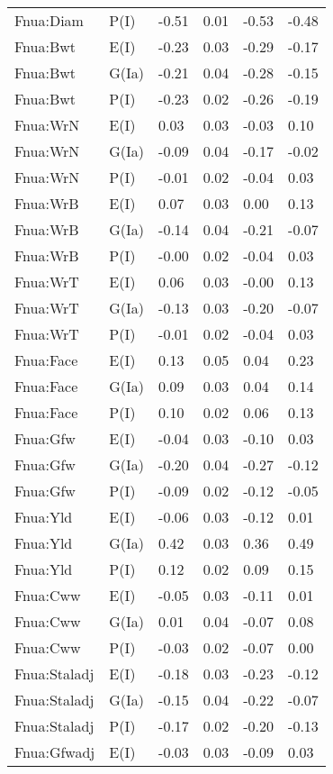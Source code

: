 \begin{center}
\begin{longtable}{|p{1.1in}|p{0.7in}|p{0.7in}|p{0.6in}|p{0.6in}|p{0.6in}|}
  Fnua:Diam & P(I) & -0.51 & 0.01 & -0.53 & -0.48 \\ 
  Fnua:Bwt & E(I) & -0.23 & 0.03 & -0.29 & -0.17 \\ 
  Fnua:Bwt & G(Ia) & -0.21 & 0.04 & -0.28 & -0.15 \\ 
  Fnua:Bwt & P(I) & -0.23 & 0.02 & -0.26 & -0.19 \\ 
  Fnua:WrN & E(I) & 0.03 & 0.03 & -0.03 & 0.10 \\ 
  Fnua:WrN & G(Ia) & -0.09 & 0.04 & -0.17 & -0.02 \\ 
  Fnua:WrN & P(I) & -0.01 & 0.02 & -0.04 & 0.03 \\ 
  Fnua:WrB & E(I) & 0.07 & 0.03 & 0.00 & 0.13 \\ 
  Fnua:WrB & G(Ia) & -0.14 & 0.04 & -0.21 & -0.07 \\ 
  Fnua:WrB & P(I) & -0.00 & 0.02 & -0.04 & 0.03 \\ 
  Fnua:WrT & E(I) & 0.06 & 0.03 & -0.00 & 0.13 \\ 
  Fnua:WrT & G(Ia) & -0.13 & 0.03 & -0.20 & -0.07 \\ 
  Fnua:WrT & P(I) & -0.01 & 0.02 & -0.04 & 0.03 \\ 
  Fnua:Face & E(I) & 0.13 & 0.05 & 0.04 & 0.23 \\ 
  Fnua:Face & G(Ia) & 0.09 & 0.03 & 0.04 & 0.14 \\ 
  Fnua:Face & P(I) & 0.10 & 0.02 & 0.06 & 0.13 \\ 
  Fnua:Gfw & E(I) & -0.04 & 0.03 & -0.10 & 0.03 \\ 
  Fnua:Gfw & G(Ia) & -0.20 & 0.04 & -0.27 & -0.12 \\ 
  Fnua:Gfw & P(I) & -0.09 & 0.02 & -0.12 & -0.05 \\ 
  Fnua:Yld & E(I) & -0.06 & 0.03 & -0.12 & 0.01 \\ 
  Fnua:Yld & G(Ia) & 0.42 & 0.03 & 0.36 & 0.49 \\ 
  Fnua:Yld & P(I) & 0.12 & 0.02 & 0.09 & 0.15 \\ 
  Fnua:Cww & E(I) & -0.05 & 0.03 & -0.11 & 0.01 \\ 
  Fnua:Cww & G(Ia) & 0.01 & 0.04 & -0.07 & 0.08 \\ 
  Fnua:Cww & P(I) & -0.03 & 0.02 & -0.07 & 0.00 \\ 
  Fnua:Staladj & E(I) & -0.18 & 0.03 & -0.23 & -0.12 \\ 
  Fnua:Staladj & G(Ia) & -0.15 & 0.04 & -0.22 & -0.07 \\ 
  Fnua:Staladj & P(I) & -0.17 & 0.02 & -0.20 & -0.13 \\ 
  Fnua:Gfwadj & E(I) & -0.03 & 0.03 & -0.09 & 0.03 \\ 

\end{longtable}
\end{center}
